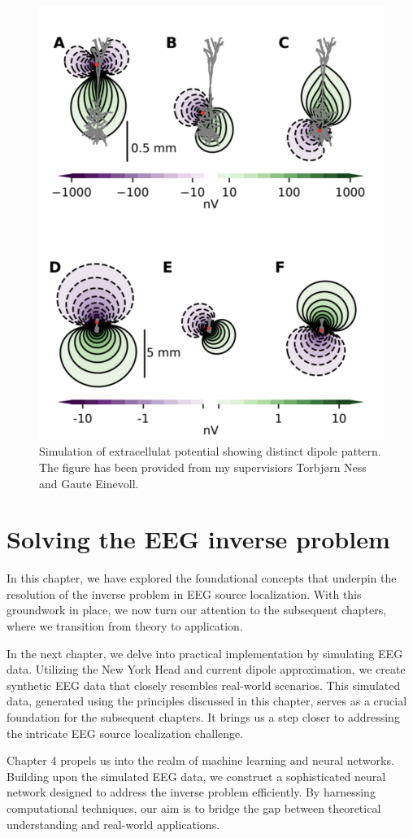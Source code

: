 \documentclass[a4paper, UKenglish, 11pt]{uiomaster}
\begin{document}
\begin{figure}
    \centering
    \includegraphics[width=\linewidth]{figures/dipole_pattern.png}
    \caption{Simulation of extracellulat potential showing distinct dipole pattern. The figure has been provided from my supervisiors Torbjørn Ness and Gaute Einevoll.}
    \label{fig:dipole_pattern}
\end{figure}

\section{Solving the EEG inverse problem}

In this chapter, we have explored the foundational concepts that underpin the resolution of the inverse problem in EEG source localization. With this groundwork in place, we now turn our attention to the subsequent chapters, where we transition from theory to application.

In the next chapter, we delve into practical implementation by simulating EEG data. Utilizing the New York Head and current dipole approximation, we create synthetic EEG data that closely resembles real-world scenarios. This simulated data, generated using the principles discussed in this chapter, serves as a crucial foundation for the subsequent chapters. It brings us a step closer to addressing the intricate EEG source localization challenge.

Chapter 4 propels us into the realm of machine learning and neural networks. Building upon the simulated EEG data, we construct a sophisticated neural network designed to address the inverse problem efficiently. By harnessing computational techniques, our aim is to bridge the gap between theoretical understanding and real-world applications.
\end{document}
